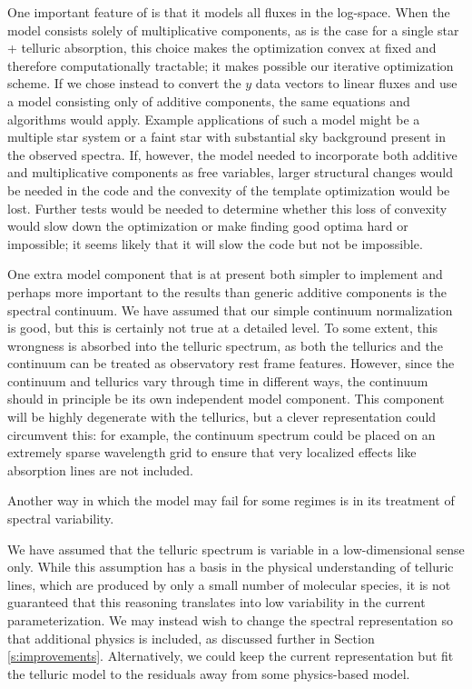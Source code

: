\documentclass[twocolumn]{aastex62}
\begin{document}
One important feature of \wobble is that it models all fluxes in the log-space. 
When the model consists solely of multiplicative components, as is the case for a single star + telluric absorption, this choice makes the optimization convex at fixed \RV and therefore computationally tractable; it makes possible our iterative optimization scheme.
If we chose instead to convert the $y$ data vectors to linear fluxes and use a model consisting only of additive components, the same equations and algorithms would apply.
Example applications of such a model might be a multiple star system or a faint star with substantial sky background present in the observed spectra. 
If, however, the model needed to incorporate both additive and multiplicative
components as free variables, larger structural changes would be needed in the code and the convexity of the template optimization would be lost. 
Further tests would be needed to determine whether this loss of convexity would slow down the optimization or make finding good optima hard or impossible; it seems likely that it will slow the code but not be impossible.

One extra model component that is at present both simpler to implement and perhaps more important to the results than generic additive components is the spectral continuum. 
We have assumed that our simple continuum normalization is good, but this is certainly not true at a detailed level. 
To some extent, this wrongness is absorbed into the telluric spectrum, as both the tellurics and the continuum can be treated as observatory rest frame features. 
However, since the continuum and tellurics vary through time in different ways, the continuum should in principle be its own independent model component. 
This component will be highly degenerate with the tellurics, but a clever representation could circumvent this: for example, the continuum spectrum could be placed on an extremely sparse wavelength grid to ensure that very localized effects like absorption lines are not included.

Another way in which the \wobble model may fail for some regimes is in its treatment of spectral variability.

We have assumed that the telluric spectrum is variable in a low-dimensional sense only. 
While this assumption has a basis in the physical understanding of telluric lines, which are produced by only a small number of molecular species, it is not guaranteed that this reasoning translates into low variability in the current parameterization. 
We may instead wish to change the spectral representation so that additional physics is included, as discussed further in Section \ref{s:improvements}. 
Alternatively, we could keep the current representation but fit the telluric model to the residuals away from some physics-based model. 
\end{document}
